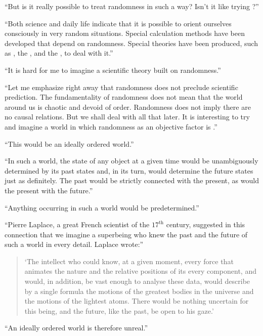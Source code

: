 \begin{dialogue}
\rdr  ``But is it really possible to treat randomness in
  such a way? Isn't it like trying ?''

\athr   ``Both science and daily life indicate that it is
  possible to orient ourselves consciously in very random
  situations. Special calculation methods have been developed that
  depend on randomness. Special theories have been produced, such as
  , the , and the
  , to deal with it.''

\rdr  ``It is hard for me to imagine a scientific theory
  built on randomness.''

\athr  ``Let me emphasize right away that randomness does
  not preclude scientific prediction. The fundamentality of randomness
  does not mean that the world around us is chaotic and devoid of
  order. Randomness does not imply there are no causal relations. But
  we shall deal with all that later. It is interesting to try and
  imagine a world in which randomness as an objective factor is
  .''

\rdr  ``This would be an ideally ordered world.''

\athr ``In such a world, the state of any object at a
  given time would be unambiguously determined by its past states and,
  in its turn, would determine the future states just as
  definitely. The past would be strictly connected with the present,
  as would the present with the future.''

\rdr  ``Anything occurring in such a world would be
predetermined.''

\athr  ``Pierre Laplace, a great French scientist of the
  $17^{\text{th}}$ century, suggested in this connection that we imagine a superbeing who knew the past and the future of such a world in
  every detail. Laplace wrote:''  
  \begin{quote}
  `The intellect who could know, at a
    given moment, every force that animates the nature and the
    relative positions of its every component, and would, in addition,
    be vast enough to analyse these data, would describe by a single
    formula the motions of the greatest bodies in the universe and the
    motions of the lightest atoms. There would be nothing uncertain
    for this being, and the future, like the past, be open to his gaze.'
\end{quote}

\rdr  ``An ideally ordered world is therefore unreal.''


\end{dialogue}
